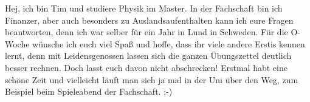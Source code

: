 \begin{multicols}{2}
{
Hej, ich bin Tim und studiere Physik im Master. In der Fachschaft bin ich Finanzer, aber auch besonders zu Auslandsaufenthalten kann ich eure Fragen beantworten, denn ich war selber für ein Jahr in Lund in Schweden. 
Für die O-Woche wünsche ich euch viel Spaß und hoffe, dass ihr viele andere Erstis kennen lernt, denn mit Leidensgenossen lassen sich die ganzen Übungszettel deutlich besser rechnen. Doch lasst euch davon nicht abschrecken! Erstmal habt eine schöne Zeit und vielleicht läuft man sich ja mal in der Uni über den Weg, zum Beispiel beim Spieleabend der Fachschaft. ;-)
}



%
%
%
%




\end{multicols}

